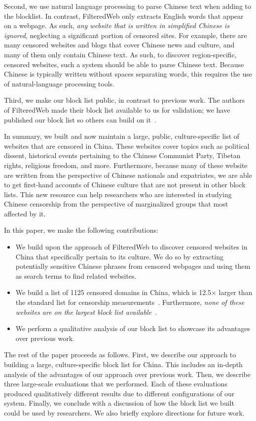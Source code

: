 Second, we use natural language processing to parse Chinese text
when adding to the blocklist. In contrast, FilteredWeb only extracts English
words that appear on a webpage. As such, \textit{any website that is written
in simplified Chinese is ignored}, neglecting a significant portion of
censored sites. For example, there are many censored websites and blogs that
cover Chinese news and culture, and many of them only contain Chinese text. As
such, to discover region-specific, censored websites, such a system should be
able to parse Chinese text. Because Chinese is typically written without
spaces separating words, this requires the use of natural-language processing
tools.

Third, we make our block list public, in contrast to previous work. The
authors of FilteredWeb made their block list available to us for validation;
we have published our block list so others can build on
it~\cite{censorsearch-lists}.

In summary, we built and now maintain a large, public, culture-specific list
of websites that are censored in China. These websites cover topics such as
political dissent, historical events pertaining to the Chinese Communist
Party, Tibetan rights, religious freedom, and more. Furthermore, because many
of these website are written from the perspective of Chinese nationals and expatriates,
we are able to get first-hand accounts of Chinese culture that are
not present in other block lists. This new resource can help researchers who
are interested in studying Chinese censorship from the perspective of
marginalized groups that most affected by it.

In this paper, we make the following contributions:
\begin{itemize}
  \item We build upon the approach of FilteredWeb to discover censored
websites in China that specifically pertain to its culture. We do so
by extracting potentially sensitive Chinese phrases from censored
webpages and using them as search terms to find related websites.
  \item We build a list of 1125 censored domains in China, which is
12.5$\times$ larger than the standard list for censorship
measurements~\cite{citizenlab:block}. Furthermore, \textit{none of
these websites are on the largest block list
available}~\cite{darer2017filteredweb}.
  \item We perform a qualitative analysis of our block list to
    showcase its advantages over previous work.
\end{itemize}

The rest of the paper proceeds as follows. First, we describe our
approach to building a large, culture-specific block list for
China. This includes an in-depth analysis of the advantages of our
approach over previous work. Then, we describe three large-scale
evaluations that we performed. Each of these evaluations
produced qualitatively different results due to different
configurations of our system. Finally, we conclude
with a discussion of how the block list we built could be used by
researchers. We also briefly explore directions for future work.